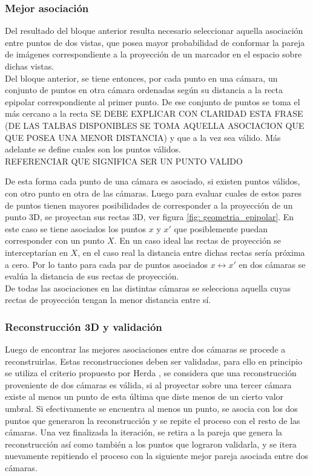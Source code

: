 \subsubsection*{Mejor asociación}

Del resultado del bloque anterior resulta necesario seleccionar aquella asociación entre puntos de dos vistas, que posea mayor probabilidad de conformar la pareja de imágenes correspondiente a la proyección de un marcador en el espacio sobre dichas vistas.\\

Del bloque anterior, se tiene entonces, por cada punto en una cámara, un conjunto de puntos en otra cámara ordenadas según su distancia a la recta epipolar correspondiente al primer punto. De ese conjunto de puntos se toma el más cercano a la recta 
SE DEBE EXPLICAR CON CLARIDAD ESTA FRASE (DE LAS TALBAS DISPONIBLES SE TOMA AQUELLA ASOCIACION QUE QUE POSEA UNA MENOR DISTANCIA)
y que a la vez sea válido. Más adelante se define cuales son los puntos válidos.\\REFERENCIAR QUE SIGNIFICA SER UN PUNTO VALIDO

De esta forma cada punto de una cámara es asociado, si existen puntos válidos, con otro punto en otra de las cámaras. Luego para evaluar cuales de estos pares de puntos tienen mayores posibilidades de corresponder a la proyección de un punto 3D, se proyectan sus rectas 3D, ver figura \ref{fig: geometria_epipolar}. En este caso se tiene asociados los puntos $x$ y $x'$ que posiblemente puedan corresponder con un punto $X$. En un caso ideal las rectas de proyección se interceptarían en $X$, en el caso real la distancia entre dichas rectas sería próxima a cero. Por lo tanto para cada par de puntos asociados $x \leftrightarrow x'$ en dos cámaras se evalúa la distancia de sus rectas de proyección.\\

De todas las asociaciones en las distintas cámaras se selecciona aquella cuyas rectas de proyección tengan la menor distancia entre sí.

\subsubsection{Reconstrucción 3D y validación}


Luego de encontrar las mejores asociaciones entre dos cámaras se procede a reconstruirlas. Estas reconstrucciones deben ser validadas, para ello en principio se utiliza el  criterio propuesto por Herda \cite{herda}, se considera que una reconstrucción proveniente de dos cámaras es válida, si al proyectar sobre una tercer cámara existe al menos un punto de esta última que diste menos de un cierto valor umbral. Si efectivamente se encuentra al menos un punto, se asocia con los dos puntos que generaron la reconstrucción y se repite el proceso con el resto de las cámaras. Una vez finalizada la iteración, se retira a la pareja que genera la reconstrucción así como también a los puntos que lograron validarla, y se itera nuevamente repitiendo el proceso con la siguiente mejor pareja asociada entre dos cámaras.  


